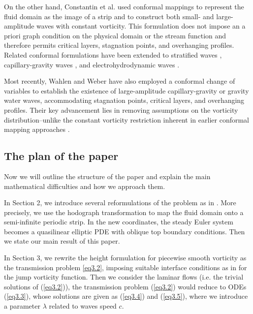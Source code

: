 \documentclass[11pt,reqno]{amsart}
\numberwithin{equation}{section}
\theoremstyle{definition}
\theoremstyle{remark}
\begin{document}
On the other hand, Constantin et al.
\cite{ConstantinSV,ConstantinV} used conformal mappings to represent
the fluid domain as the image of a strip and to construct both small-
and large-amplitude waves with constant vorticity.  This formulation
does not impose an a priori graph condition on the physical domain or
the stream function and therefore permits critical layers,
stagnation points, and overhanging profiles.  Related conformal
formulations have been extended to stratified waves \cite{Haziot},
capillary-gravity waves \cite{WangXZ}, and electrohydrodynamic waves
\cite{DaiFZ}.

Most recently, Wahlen and Weber \cite{Erik,Erik1} have also employed a conformal change of variables to establish the existence of large-amplitude capillary-gravity or gravity water waves, accommodating stagnation points, critical layers, and overhanging profiles. Their key advancement lies in removing assumptions on the vorticity distribution--unlike the constant vorticity restriction inherent in earlier conformal mapping approaches \cite{ConstantinSV,ConstantinV}.

\subsection{The plan of the paper}

Now we will outline the structure of the paper and explain the main
mathematical difficulties and how we approach them.

In Section 2, we introduce several reformulations of the problem as
in \cite{ConstantinS}. More precisely, we use the hodograph
transformation to map the fluid domain onto a semi-infinite periodic
strip. In the new coordinates, the steady Euler system becomes a
quasilinear elliptic PDE with oblique top boundary conditions. Then
we state our main result of this paper.


In Section 3, we rewrite the height formulation for piecewise smooth
vorticity as the transmission problem \eqref{eq3.2}, imposing
suitable interface conditions as in \cite{MartinM} for the jump
vorticity function. Then we consider the laminar flows (i.e. the
trivial solutions of (\ref{eq3.2})), the transmission problem
(\ref{eq3.2}) would reduce to ODEs (\ref{eq3.3}), whose solutions
are given as (\ref{eq3.4}) and (\ref{eq3.5}), where we introduce a
parameter $\lambda$ related to waves speed $c$.
\end{document}
